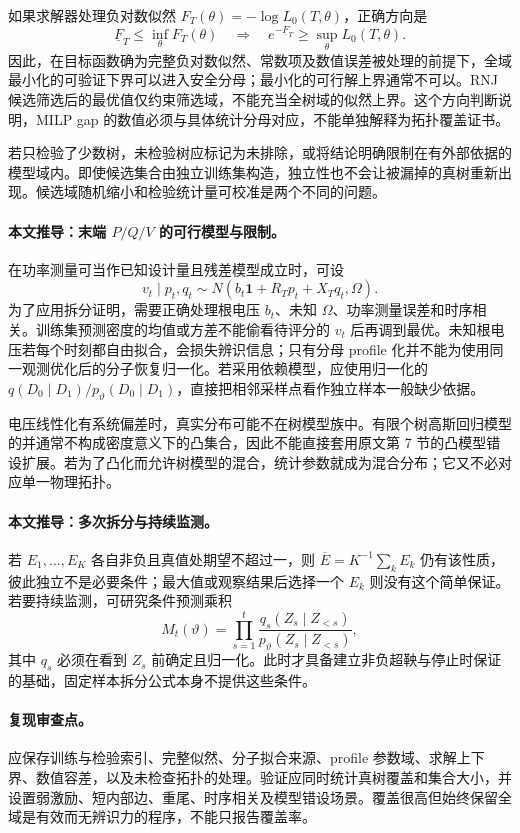\documentclass[UTF8,11pt,fontset=fandol]{ctexart}
\theoremstyle{remark}
\numberwithin{equation}{section}
\begin{document}
如果求解器处理负对数似然 $F_T(\theta)=-\log L_0(T,\theta)$，正确方向是
\[
 \underline F_T\le\inf_\theta F_T(\theta)
 \quad\Longrightarrow\quad
 e^{-\underline F_T}\ge\sup_\theta L_0(T,\theta).
\]
因此，在目标函数确为完整负对数似然、常数项及数值误差被处理的前提下，全域最小化的可验证下界可以进入安全分母；最小化的可行解上界通常不可以。RNJ 候选筛选后的最优值仅约束筛选域，不能充当全树域的似然上界。这个方向判断说明，MILP gap 的数值必须与具体统计分母对应，不能单独解释为拓扑覆盖证书。

若只检验了少数树，未检验树应标记为未排除，或将结论明确限制在有外部依据的模型域内。即使候选集合由独立训练集构造，独立性也不会让被漏掉的真树重新出现。候选域随机缩小和检验统计量可校准是两个不同的问题。

\paragraph{本文推导：末端 $P/Q/V$ 的可行模型与限制。}
在功率测量可当作已知设计量且残差模型成立时，可设
\[
 v_t\mid p_t,q_t
 \sim N\!\left(b_t\mathbf1+R_Tp_t+X_Tq_t,\Omega\right).
\]
为了应用拆分证明，需要正确处理根电压 $b_t$、未知 $\Omega$、功率测量误差和时序相关。训练集预测密度的均值或方差不能偷看待评分的 $v_t$ 后再调到最优。未知根电压若每个时刻都自由拟合，会损失辨识信息；只有分母 profile 化并不能为使用同一观测优化后的分子恢复归一化。若采用依赖模型，应使用归一化的
$q(D_0\mid D_1)/p_\vartheta(D_0\mid D_1)$，直接把相邻采样点看作独立样本一般缺少依据。

电压线性化有系统偏差时，真实分布可能不在树模型族中。有限个树高斯回归模型的并通常不构成密度意义下的凸集合，因此不能直接套用原文第 7 节的凸模型错设扩展。若为了凸化而允许树模型的混合，统计参数就成为混合分布；它又不必对应单一物理拓扑。

\paragraph{本文推导：多次拆分与持续监测。}
若 $E_1,\ldots,E_K$ 各自非负且真值处期望不超过一，则
$\overline E=K^{-1}\sum_k E_k$ 仍有该性质，彼此独立不是必要条件；最大值或观察结果后选择一个 $E_k$ 则没有这个简单保证。若要持续监测，可研究条件预测乘积
\[
 M_t(\vartheta)
 =\prod_{s=1}^t
 \frac{q_s(Z_s\mid Z_{<s})}{p_\vartheta(Z_s\mid Z_{<s})},
\]
其中 $q_s$ 必须在看到 $Z_s$ 前确定且归一化。此时才具备建立非负超鞅与停止时保证的基础，固定样本拆分公式本身不提供这些条件。

\paragraph{复现审查点。}
应保存训练与检验索引、完整似然、分子拟合来源、profile 参数域、求解上下界、数值容差，以及未检查拓扑的处理。验证应同时统计真树覆盖和集合大小，并设置弱激励、短内部边、重尾、时序相关及模型错设场景。覆盖很高但始终保留全域是有效而无辨识力的程序，不能只报告覆盖率。
\end{document}
